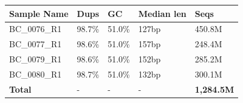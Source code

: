 \documentclass[
  11pt,
  a4paper,
]{report}
\begin{document}
\begin{table}

\caption{\label{tbl-example}After trimming}

\begin{minipage}{\linewidth}

\begin{longtable}[]{@{}lllll@{}}
\toprule\noalign{}
Sample Name & Dups & GC & Median len & Seqs \\
\midrule\noalign{}
\endhead
\bottomrule\noalign{}
\endlastfoot
BC\_0076\_R1 & 98.7\% & 51.0\% & 127bp & 450.8M \\
BC\_0077\_R1 & 98.6\% & 51.0\% & 157bp & 248.4M \\
BC\_0079\_R1 & 98.6\% & 51.0\% & 152bp & 285.2M \\
BC\_0080\_R1 & 98.7\% & 51.0\% & 132bp & 300.1M \\
\textbf{Total} & - & - & - & \textbf{1,284.5M} \\
\end{longtable}

\end{minipage}%

\end{table}%
\end{document}
